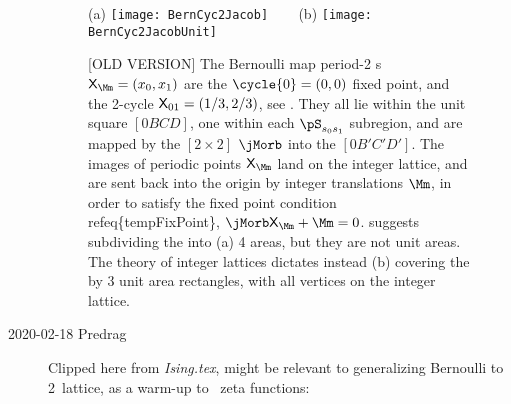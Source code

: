 \begin{description}
\begin{figure}
  \centering
{(a)}
\texttt{[image: BernCyc2Jacob]}
~~~
{(b)} %
\texttt{[image: BernCyc2JacobUnit]}
  \caption{\label{fig:BernCyc2JacobOld}
[OLD VERSION] The Bernoulli map  period-2 {\lattstate}s
$\Xx_\Mm=(\ssp_0,\ssp_1)$ are the $\cycle{0}=(0,0)$ fixed
point, and the 2-cycle $\mathsf{X}_{01}=({1}/{3},{2}/{3})$, see
. They all lie within the unit square $[0BCD]$,
one within each $\pS_{\Ssym{0}\Ssym{1}}$ subregion, and are mapped by the
$[2\!\times\!2]$ {\jacobianOrb} $\jMorb$  into the
{\fundPip} $[0B'C'D']$. The images
of periodic points $\Xx_\Mm$ land on the integer lattice, and are sent back
into the origin by integer translations $\Mm$, in order to satisfy the
fixed point condition refeq\{tempFixPoint\}, $\jMorb\Xx_\Mm+\Mm=0$.
 suggests subdividing the {\fundPip}
into (a) 4 areas, but they are not unit areas. The theory of integer lattices
dictates instead (b) covering the {\fundPip} by 3 unit area
rectangles, with
all vertices on the integer lattice.
          }
\end{figure}
%


\item[2020-02-18 Predrag] Clipped here from
\emph{Ising.tex}, might be relevant to generalizing
Bernoulli to 2\dmn\ lattice, as a warm-up to \catlatt\ zeta functions:


\end{description}
